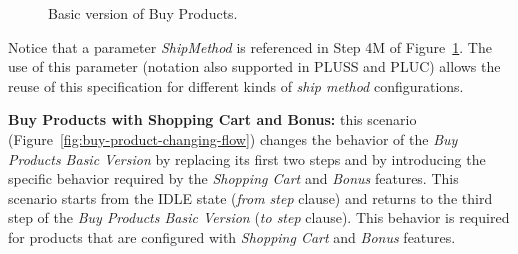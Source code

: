 \documentclass{acm_proc_article-sp}
\begin{document}
\begin{figure}[h]
\caption{Basic version of Buy Products.}
\label{fig:buy-product-basic-flow}
\end{figure}

Notice that a parameter \emph{ShipMethod} is referenced in Step 4M of Figure~\ref{fig:buy-product-basic-flow}. The use of this parameter (notation also supported in PLUSS and PLUC) allows the reuse of this specification 
for different kinds of \emph{ship method} configurations.

{\bf Buy Products with Shopping Cart and Bonus:} this scenario (Figure~\ref{fig:buy-product-changing-flow}) changes the behavior of the \emph{Buy Products Basic Version} by replacing its first two steps and by introducing the specific behavior required by the \emph{Shopping Cart} and 
\emph{Bonus} features. This scenario starts from the IDLE state (\emph{from step} clause) and returns to the third step of the \emph{Buy Products Basic Version} (\emph{to step} clause). This behavior is required for products that are configured with \emph{Shopping Cart} and \emph{Bonus} features.
\end{document}
